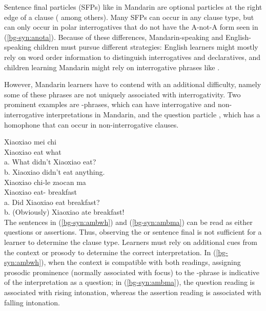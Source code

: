 Sentence final particles (SFPs) like \ma{} in Mandarin are optional particles at the right edge of a clause (\citealt{chao1968, zhudexi, huang1982, cheng1991, liboya2006} among others). Many SFPs can occur in any clause type, but \ma{} can only occur in polar interrogatives that do not have the A-not-A form seen in (\ref{bg-syn:anota}). Because of these differences, Mandarin-speaking and English-speaking children must pursue different strategies: English learners might mostly rely on word order information to distinguish interrogatives and declaratives, and children learning Mandarin might rely on interrogative phrases like . 

However, Mandarin learners have to contend with an additional difficulty, namely some of these phrases are not uniquely associated with interrogativity. Two prominent examples are \twh-phrases, which can have interrogative and non-interrogative interpretations in Mandarin, and the question particle \ma, which has a homophone that can occur in non-interrogative clauses.


\gll Xiaoxiao	mei	chi	\\
Xiaoxiao	\Neg{}	eat	what\\
a.	What didn't Xiaoxiao eat?\\
b.	Xiaoxiao didn't eat anything.\\
\eex
{}
\gll Xiaoxiao	chi-le		zaocan		ma\\
	Xiaoxiao	eat-\Asp{}	breakfast	\Sfp{}\\
a.	Did Xiaoxiao eat breakfast?\\
b.	(Obviously) Xiaoxiao ate breakfast!\\
\eex 
The sentences in (\ref{bg-syn:ambwh}) and (\ref{bg-syn:ambma}) can be read as either questions or assertions. Thus, observing the \twh{}  or sentence final \ma{} is not sufficient for a learner to determine the clause type. Learners must rely on additional cues from the context or prosody to determine the correct interpretation. In (\ref{bg-syn:ambwh}), when the context is compatible with both readings, assigning prosodic prominence (normally associated with focus) to the \twh-phrase is indicative of the interpretation as a question; in (\ref{bg-syn:ambma}), the question reading is associated with rising intonation, whereas the assertion reading is associated with falling intonation. 



